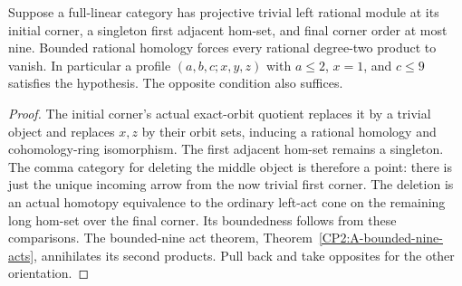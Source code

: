\begin{corollary}
\label{CP2:A-baseline-projective-singleton}
Suppose a full-linear category has projective trivial left
rational module at its initial corner, a singleton first
adjacent hom-set, and final corner order at most nine.
Bounded rational
homology forces every rational degree-two product to
vanish.  In particular a profile $(a,b,c;x,y,z)$ with
$a\leq2$, $x=1$, and $c\leq9$ satisfies the hypothesis.
The opposite condition also suffices.
\end{corollary}
\begin{proof}
The initial corner's actual exact-orbit quotient replaces it
by a trivial object and replaces $x,z$ by their orbit
sets, inducing a rational homology and cohomology-ring
isomorphism.  The first adjacent hom-set remains a
singleton.  The comma category for deleting the middle
object is therefore a point: there is just the unique
incoming arrow from the now trivial first corner.
The deletion is an actual homotopy equivalence to
the ordinary left-act cone on the remaining long
hom-set over the final corner.  Its boundedness
follows from these comparisons.  The bounded-nine
act theorem, Theorem~\ref{CP2:A-bounded-nine-acts},
annihilates its second products.  Pull back and take
opposites for the other orientation.
\end{proof}

